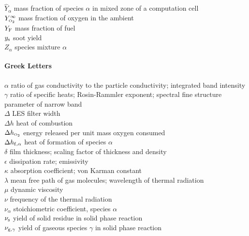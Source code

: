 \begin{tabbing}
$\hat{Y}_\alpha$          \> mass fraction of species $\alpha$ in mixed zone of a computation cell \\
$Y_{\text{\tiny \hbox{O}$_2$}}^\infty$          \> mass fraction of oxygen in the ambient   \\
$Y_{\rm F}$               \> mass fraction of fuel   \\
$y_{\rm s}$               \> soot yield \\
$Z_\alpha$                \> species mixture $\alpha$   \\
\hspace{0.1in}            \> \\
{\bf Greek Letters}       \> \\
\hspace{0.1in}            \> \\
$\alpha$                  \> ratio of gas conductivity to the particle conductivity; integrated band intensity \\
$\gamma$                  \> ratio of specific heats; Rosin-Rammler exponent; spectral fine structure parameter of narrow band \\
$\Delta$                  \> LES filter width \\
$\Delta h$                \> heat of combustion \\
$\Delta h_{\text{\tiny \hbox{O}$_2$}}$          \> energy released per unit mass oxygen consumed \\
$\Delta h_{\rm f,\alpha}$ \> heat of formation of species $\alpha$ \\
$\delta$                  \> film thickness; scaling factor of thickness and density \\
$\epsilon$                \> dissipation rate; emissivity \\
$\kappa$                  \> absorption coefficient; von Karman constant \\
$\lambda$                 \> mean free path of gas molecules; wavelength of thermal radiation\\
$\mu$                     \> dynamic viscosity \\
$\nu$                     \> frequency of the thermal radiation \\
$\nu_\alpha$              \> stoichiometric coefficient, species $\alpha$ \\
$\nu_{\rm s}$             \> yield of solid residue in solid phase reaction \\
$\nu_{{\rm g},\gamma}$    \> yield of gaseous species $\gamma$ in solid phase reaction \\

\end{tabbing}
